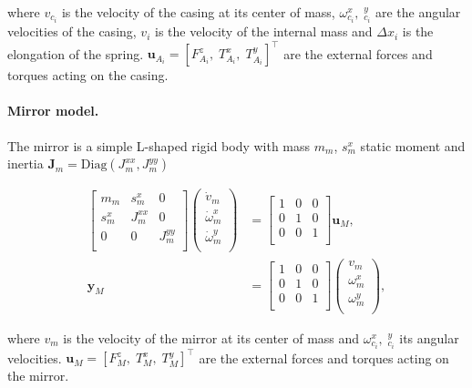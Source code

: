 where $v_{c_i}$ is the velocity of the casing at its center of mass, $\omega_{c_i}^x, \; _{c_i}^y$ are the angular velocities of the casing, $v_i$ is the velocity of the internal mass and $\Delta x_i$ is the elongation of the spring. $\bm{u}_{A_i} = [F_{A_i}^z, \;  T_{A_i}^x, \;  T_{A_i}^y]^\top$ are the external forces and torques acting on the casing.

\paragraph{Mirror model.} The mirror is a simple L-shaped rigid body with mass $m_m$, $s_m^x$ static moment and inertia $\mathbf{J}_m = \mathrm{Diag}({J}_{m}^{xx}, {J}_{m}^{yy})$

\begin{equation}
\begin{aligned}
\begin{bmatrix}
m_{m} & s_m^x & 0\\
s_m^x & {J}_{m}^{xx} & 0 \\
0 & 0 & {J}_{m}^{yy} \\
\end{bmatrix}
\begin{pmatrix}
\dot{v}_{m} \\
\dot{\omega}_{m}^x \\
\dot{\omega}_{m}^y \\
\end{pmatrix} &= 
\begin{bmatrix}
1 & 0 & 0 \\
0 & 1 & 0 \\
0 & 0 & 1 \\
\end{bmatrix}\mathbf{u}_M, \\
\mathbf{y}_M &= \begin{bmatrix}
1 & 0 & 0 \\
0 & 1 & 0 \\
0 & 0 & 1 \\
\end{bmatrix}
\begin{pmatrix}
{v}_{m} \\
{\omega}_{m}^x \\
{\omega}_{m}^y \\
\end{pmatrix},
\end{aligned}
\end{equation}

where $v_{m}$ is the velocity of the mirror at its center of mass and $\omega_{c_i}^x, \; _{c_i}^y$ its angular velocities. $\mathbf{u}_M = [F_{M}^z, \;  T_{M}^x, \;  T_{M}^y]^\top$ are the external forces and torques acting on the mirror.

